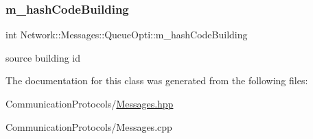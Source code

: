 \subsubsection{\texorpdfstring{m\+\_\+hash\+Code\+Building}{m\_hashCodeBuilding}}
{\footnotesize\ttfamily int Network\+::\+Messages\+::\+Queue\+Opti\+::m\+\_\+hash\+Code\+Building}

source building id 

The documentation for this class was generated from the following files\+:\begin{DoxyCompactItemize}
\item 
Communication\+Protocols/\hyperlink{_messages_8hpp}{Messages.\+hpp}\item 
Communication\+Protocols/Messages.\+cpp\end{DoxyCompactItemize}
